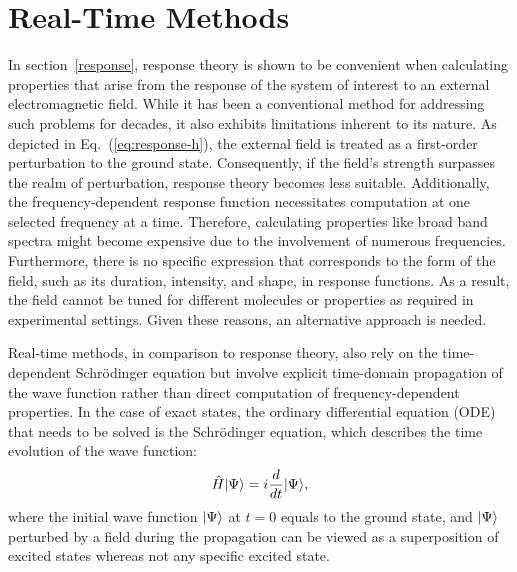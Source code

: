 \section{Real-Time Methods}\label{rt}
In section~\ref{response}, response theory is shown to be convenient when calculating properties that arise from the response of the system of interest to an external electromagnetic field. While it has been a conventional method for addressing such problems for decades, it also exhibits limitations inherent to its nature. As depicted in Eq.~(\ref{eq:response-h}), the external field is treated as a first-order perturbation to the ground state. Consequently, if the field's strength surpasses the realm of perturbation, response theory becomes less suitable. Additionally, the frequency-dependent response function necessitates computation at one selected frequency at a time. Therefore, calculating properties like broad band spectra might become expensive due to the involvement of numerous frequencies. Furthermore, there is no specific expression that corresponds to the form of the field, such as its duration, intensity, and shape, in response functions. As a result, the field cannot be tuned for different molecules or properties as required in experimental settings. Given these reasons, an alternative approach is needed.

Real-time methods, in comparison to response theory, also rely on the time-dependent Schr\"odinger equation but involve explicit time-domain propagation of the wave function rather than direct computation of frequency-dependent properties.\cite{Goings2018, Li2020} In the case of exact states, the ordinary differential equation (ODE) that needs to be solved is the Schr\"odinger equation, which describes the time evolution of the wave function:
\begin{equation}
\hat{H}| \Psi \rangle = i\frac{d}{dt}| \Psi \rangle,
\end{equation}
where the initial wave function $| \Psi \rangle$ at $t=0$ equals to the ground state, and $| \Psi \rangle$ perturbed by a field during the propagation can be viewed as a superposition of excited states whereas not any specific excited state. 

